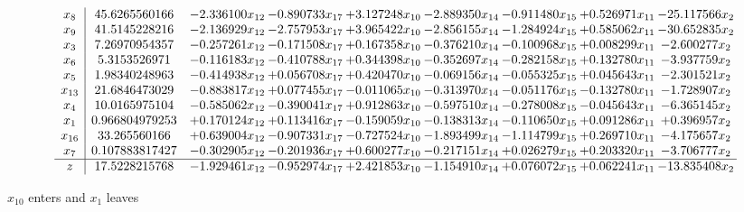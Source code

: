 \documentclass[10pt]{article}
\begin{document}
 \[\begin{array}{c| c c@{\hskip 2pt} c@{\hskip 2pt} c@{\hskip 2pt} c@{\hskip 2pt} c@{\hskip 2pt} c@{\hskip 2pt} c@{\hskip 2pt} }
 x_{8}   &  45.6265560166 & -2.336100 x_{12} & -0.890733 x_{17} & + 3.127248 x_{10} & -2.889350 x_{14} & -0.911480 x_{15} & + 0.526971 x_{11} & -25.117566 x_{2}\\
 x_{9}   &  41.5145228216 & -2.136929 x_{12} & -2.757953 x_{17} & + 3.965422 x_{10} & -2.856155 x_{14} & -1.284924 x_{15} & + 0.585062 x_{11} & -30.652835 x_{2}\\
 x_{3}   &  7.26970954357 & -0.257261 x_{12} & -0.171508 x_{17} & + 0.167358 x_{10} & -0.376210 x_{14} & -0.100968 x_{15} & + 0.008299 x_{11} & -2.600277 x_{2}\\
 x_{6}   &  5.3153526971 & -0.116183 x_{12} & -0.410788 x_{17} & + 0.344398 x_{10} & -0.352697 x_{14} & -0.282158 x_{15} & + 0.132780 x_{11} & -3.937759 x_{2}\\
 x_{5}   &  1.98340248963 & -0.414938 x_{12} & + 0.056708 x_{17} & + 0.420470 x_{10} & -0.069156 x_{14} & -0.055325 x_{15} & + 0.045643 x_{11} & -2.301521 x_{2}\\
 x_{13}   &  21.6846473029 & -0.883817 x_{12} & + 0.077455 x_{17} & -0.011065 x_{10} & -0.313970 x_{14} & -0.051176 x_{15} & -0.132780 x_{11} & -1.728907 x_{2}\\
 x_{4}   &  10.0165975104 & -0.585062 x_{12} & -0.390041 x_{17} & + 0.912863 x_{10} & -0.597510 x_{14} & -0.278008 x_{15} & -0.045643 x_{11} & -6.365145 x_{2}\\
 x_{1}   &  0.966804979253 & + 0.170124 x_{12} & + 0.113416 x_{17} & -0.159059 x_{10} & -0.138313 x_{14} & -0.110650 x_{15} & + 0.091286 x_{11} & + 0.396957 x_{2}\\
 x_{16}   &  33.265560166 & + 0.639004 x_{12} & -0.907331 x_{17} & -0.727524 x_{10} & -1.893499 x_{14} & -1.114799 x_{15} & + 0.269710 x_{11} & -4.175657 x_{2}\\
 x_{7}   &  0.107883817427 & -0.302905 x_{12} & -0.201936 x_{17} & + 0.600277 x_{10} & -0.217151 x_{14} & + 0.026279 x_{15} & + 0.203320 x_{11} & -3.706777 x_{2}\\
\hline
z    &  17.5228215768 & -1.929461 x_{12} & -0.952974 x_{17} & + 2.421853 x_{10} & -1.154910 x_{14} & + 0.076072 x_{15} & + 0.062241 x_{11} & -13.835408 x_{2}\\
\end{array}\]


 $ x_{10} $ enters and $ x_{1} $ leaves 
\end{document}
